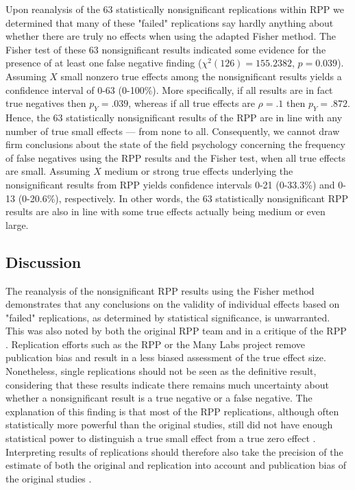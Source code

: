 \documentclass{article}
\begin{document}
Upon reanalysis of the 63 statistically nonsignificant replications within RPP we determined that many of these "failed" replications say hardly anything about whether there are truly no effects when using the adapted Fisher method. The Fisher test of these 63 nonsignificant results indicated some evidence for the presence of at least one false negative finding ($\chi^2(126)=155.2382$, $p=0.039$). Assuming $X$ small nonzero true effects among the nonsignificant results yields a confidence interval of 0-63 (0-100\%). More specifically, if all results are in fact true negatives then $p_Y=.039$, whereas if all true effects are $\rho=.1$ then $p_Y=.872$. Hence, the 63 statistically nonsignificant results of the RPP are in line with any number of true small effects --- from none to all. Consequently, we cannot draw firm conclusions about the state of the field psychology concerning the frequency of false negatives using the RPP results and the Fisher test, when all true effects are small. Assuming $X$ medium or strong true effects underlying the nonsignificant results from RPP yields confidence intervals 0-21 (0-33.3\%) and 0-13 (0-20.6\%), respectively. In other words, the 63 statistically nonsignificant RPP results are also in line with some true effects actually being medium or even large.

\subsection*{Discussion}

The reanalysis of the nonsignificant RPP results using the Fisher method demonstrates that any conclusions on the validity of individual effects based on "failed" replications, as determined by statistical significance, is unwarranted. This was also noted by both the original RPP team \cite{Open_Science_Collaboration2015-zs,Anderson2016-bv} and in a critique of the RPP \cite{Gilbert2016-mi}. Replication efforts such as the RPP or the Many Labs project remove publication bias and result in a less biased assessment of the true effect size. Nonetheless, single replications should not be seen as the definitive result, considering that these results indicate there remains much uncertainty about whether a nonsignificant result is a true negative or a false negative. The explanation of this finding is that most of the RPP replications, although often statistically more powerful than the original studies, still did not have enough statistical power to distinguish a true small effect from a true zero effect \cite{Maxwell2015-yb}. Interpreting results of replications should therefore also take the precision of the estimate of both the original and replication into account \cite{Cumming2014-fi} and publication bias of the original studies \cite{10.1371/journal.pone.0149794}.
\end{document}
